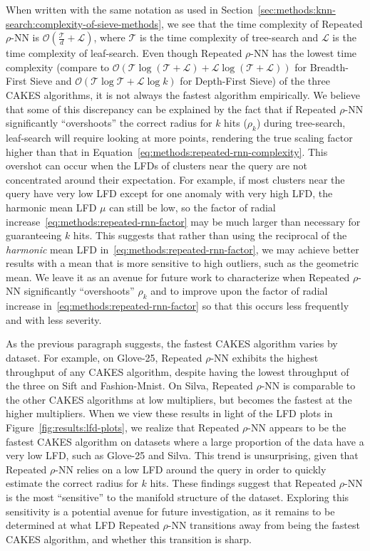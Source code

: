 When written with the same notation as used in Section~\ref{sec:methods:knn-search:complexity-of-sieve-methods}, we see that the time complexity of Repeated $\rho$-NN is $\mathcal{O}(\tfrac{\mathcal{T}}{d} + \mathcal{L})$, where $\mathcal{T}$ is the time complexity of tree-search and $\mathcal{L}$ is the time complexity of leaf-search. 
Even though Repeated $\rho$-NN has the lowest time complexity (compare to $\mathcal{O}(\mathcal{T}\log{(\mathcal{T}+\mathcal{L})} + \mathcal{L}\log{(\mathcal{T}+\mathcal{L})})$ for Breadth-First Sieve and $\mathcal{O}(\mathcal{T}\log{\mathcal{T}} + \mathcal{L}\log{k})$ for Depth-First Sieve) of the three CAKES algorithms, it is not always the fastest algorithm empirically. 
We believe that some of this discrepancy can be explained by the fact that if Repeated $\rho$-NN significantly ``overshoots'' the correct radius for $k$ hits ($\rho_k$) during tree-search, leaf-search will require looking at more points, rendering the true scaling factor higher than that in Equation~\ref{eq:methods:repeated-rnn-complexity}.
This overshot can occur when the LFDs of clusters near the query are not concentrated around their expectation. 
For example, if most clusters near the query have very low LFD except for one anomaly with very high LFD, 
the harmonic mean LFD $\mu$ can still be low, so the factor of radial increase~\ref{eq:methods:repeated-rnn-factor} may be much larger than necessary for guaranteeing $k$ hits.  
This suggests that rather than using the reciprocal of the \textit{harmonic} mean LFD in~\ref{eq:methods:repeated-rnn-factor}, we may achieve better results with a mean that is more sensitive to high outliers, such as the geometric mean.
We leave it as an avenue for future work to characterize when Repeated $\rho$-NN significantly ``overshoots'' $\rho_k$ and to improve upon the factor of radial increase in~\ref{eq:methods:repeated-rnn-factor} so that this occurs less frequently and with less severity.

As the previous paragraph suggests, the fastest CAKES algorithm varies by dataset.
For example, on Glove-25, Repeated $\rho$-NN exhibits the highest throughput of any CAKES algorithm, despite having the lowest throughput of the three on Sift and Fashion-Mnist.
On Silva, Repeated $\rho$-NN is comparable to the other CAKES algorithms at low multipliers, but becomes the fastest at the higher multipliers.
When we view these results in light of the LFD plots in Figure~\ref{fig:results:lfd-plots}, we realize that Repeated $\rho$-NN appears to be the fastest CAKES algorithm on datasets where a large proportion of the data have a very low LFD, such as Glove-25 and Silva.
This trend is unsurprising, given that Repeated $\rho$-NN relies on a low LFD around the query in order to quickly estimate the correct radius for $k$ hits.
These findings suggest that Repeated $\rho$-NN is the most ``sensitive'' to the manifold structure of the dataset.
Exploring this sensitivity is a potential avenue for future investigation, as it remains to be determined at what LFD Repeated $\rho$-NN transitions away from being the fastest CAKES algorithm, and whether this transition is sharp.


